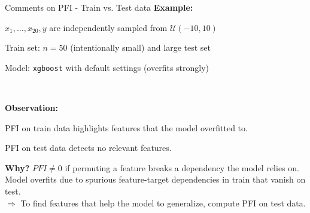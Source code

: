 \documentclass[10pt,compress,t,notes=noshow, xcolor=table]{beamer}
\begin{document}
\begin{framev}[align=top]{Comments on PFI - Train vs. Test data}
\textbf{Example:} %
\begin{itemizeM}
\item $x_1, \dots, x_{20}, y$ are independently sampled from $\mathcal{U} (-10, 10)$
\item Train set: $n = 50$ (intentionally small) and large test set
\item Model: \texttt{xgboost} with default settings (overfits strongly)
\end{itemizeM}
{\centering
{}\\
\par}
\textbf{Observation:}
\begin{itemizeM}
\item PFI on train data highlights features that the model overfitted to.
\item PFI on test data detects no relevant features.
\end{itemizeM}
\pause
\spacer[0.25]
\textbf{Why?} $PFI \neq 0$ if permuting a feature breaks a dependency the model relies on.
Model overfits due to spurious feature-target dependencies in train that vanish on test.\\
$\Rightarrow$ To find features that help the model to generalize, compute PFI on test data.
\end{framev}
\end{document}
